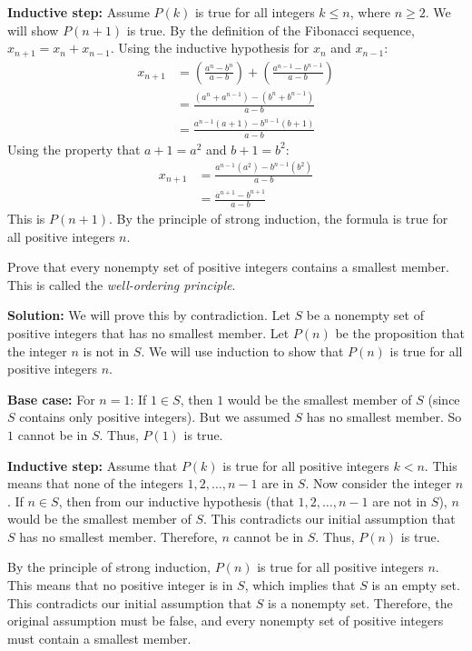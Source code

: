 \textbf{Inductive step:}
Assume $P(k)$ is true for all integers $k \leq n$, where $n \geq 2$. We will show $P(n+1)$ is true.
By the definition of the Fibonacci sequence, $x_{n+1} = x_n + x_{n-1}$.
Using the inductive hypothesis for $x_n$ and $x_{n-1}$:
\begin{align*}
x_{n+1} &= \left( \frac{a^n - b^n}{a-b} \right) + \left( \frac{a^{n-1} - b^{n-1}}{a-b} \right) \\
&= \frac{(a^n + a^{n-1}) - (b^n + b^{n-1})}{a-b} \\
&= \frac{a^{n-1}(a+1) - b^{n-1}(b+1)}{a-b}
\end{align*}
Using the property that $a+1 = a^2$ and $b+1 = b^2$:
\begin{align*}
x_{n+1} &= \frac{a^{n-1}(a^2) - b^{n-1}(b^2)}{a-b} \\
&= \frac{a^{n+1} - b^{n+1}}{a-b}
\end{align*}
This is $P(n+1)$. By the principle of strong induction, the formula is true for all positive integers $n$.

\begin{problembox}
Prove that every nonempty set of positive integers contains a smallest member. This is called the \textit{well-ordering principle}.
\end{problembox}

\textbf{Solution:}
We will prove this by contradiction.
Let $S$ be a nonempty set of positive integers that has no smallest member.
Let $P(n)$ be the proposition that the integer $n$ is not in $S$. We will use induction to show that $P(n)$ is true for all positive integers $n$.

\textbf{Base case:}
For $n=1$: If $1 \in S$, then $1$ would be the smallest member of $S$ (since $S$ contains only positive integers). But we assumed $S$ has no smallest member. So $1$ cannot be in $S$. Thus, $P(1)$ is true.

\textbf{Inductive step:}
Assume that $P(k)$ is true for all positive integers $k < n$. This means that none of the integers $1, 2, \dots, n-1$ are in $S$.
Now consider the integer $n$. If $n \in S$, then from our inductive hypothesis (that $1, 2, \dots, n-1$ are not in $S$), $n$ would be the smallest member of $S$.
This contradicts our initial assumption that $S$ has no smallest member.
Therefore, $n$ cannot be in $S$. Thus, $P(n)$ is true.

By the principle of strong induction, $P(n)$ is true for all positive integers $n$. This means that no positive integer is in $S$, which implies that $S$ is an empty set.
This contradicts our initial assumption that $S$ is a nonempty set.
Therefore, the original assumption must be false, and every nonempty set of positive integers must contain a smallest member.


